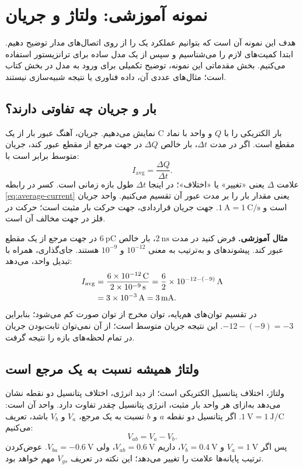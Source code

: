 \section{نمونه آموزشی: ولتاژ و جریان}
\label{sec:electrical-basics}
هدف این نمونه آن است که بتوانیم عملکرد یک  را از روی
اتصال‌های مدار توضیح دهیم. ابتدا کمیت‌های لازم را می‌شناسیم و سپس از یک مدل ساده
برای ترانزیستور استفاده می‌کنیم. بخش مقدماتی این نمونه، توضیح تکمیلی برای ورود
به مدل  در بخش  کتاب است؛ مثال‌های عددی آن، داده فناوری یا نتیجه شبیه‌سازی نیستند.

\subsection{بار و جریان چه تفاوتی دارند؟}
بار الکتریکی را با \(Q\) و واحد  با نماد \(\mathrm{C}\) نمایش می‌دهیم.
جریان، آهنگ عبور بار از یک مقطع است. اگر در مدت \(\Delta t\)، بار خالص
\(\Delta Q\) در جهت مرجع از مقطع عبور کند، جریان متوسط برابر است با:
\begin{equation}\label{eq:average-current}
I_{\mathrm{avg}}=\frac{\Delta Q}{\Delta t}.
\end{equation}
علامت \(\Delta\) یعنی «تغییر» یا «اختلاف»؛ در اینجا \(\Delta t\) طول بازه زمانی است.
کسر در رابطه \eqref{eq:average-current} یعنی مقدار بار را بر مدت عبور آن تقسیم می‌کنیم.
واحد جریان  است و \(\qty{1}{\ampere}=\qty{1}{\coulomb\per\second}\).
جهت جریان قراردادی، جهت حرکت بار مثبت است؛ حرکت  در فلز در جهت مخالف آن است.

\textbf{مثال آموزشی.} فرض کنید در مدت \(\qty{2}{\nano\second}\)، بار خالص
\(\qty{6}{\pico\coulomb}\) در جهت مرجع از یک مقطع عبور کند.
پیشوندهای  و  به‌ترتیب به معنی \(10^{-12}\) و \(10^{-9}\) هستند.
جای‌گذاری، همراه با تبدیل واحد، می‌دهد:
\begin{align}
I_{\mathrm{avg}}
&=\frac{6\times10^{-12}\,\mathrm{C}}{2\times10^{-9}\,\mathrm{s}}
=\frac{6}{2}\times10^{-12-(-9)}\,\mathrm{A}\notag\\
&=3\times10^{-3}\,\mathrm{A}=\qty{3}{\milli\ampere}.
\end{align}
در تقسیم توان‌های هم‌پایه، توان مخرج از توان صورت کم می‌شود؛ بنابراین
\(-12-(-9)=-3\). این نتیجه جریان متوسط است؛ از آن نمی‌توان ثابت‌بودن جریان
در تمام لحظه‌های بازه را نتیجه گرفت.

\subsection{ولتاژ همیشه نسبت به یک مرجع است}
ولتاژ، اختلاف پتانسیل الکتریکی است؛ از دید انرژی، اختلاف پتانسیل دو نقطه نشان می‌دهد
به‌ازای هر واحد بار مثبت، انرژی پتانسیل چقدر تفاوت دارد.
واحد آن  است: \(\qty{1}{\volt}=\qty{1}{\joule\per\coulomb}\).
اگر پتانسیل دو نقطه \(a\) و \(b\) نسبت به یک مرجع، \(V_a\) و \(V_b\) باشد، تعریف می‌کنیم:
\begin{equation}\label{eq:voltage-difference}
V_{ab}=V_a-V_b.
\end{equation}
پس اگر \(V_a=\qty{1}{\volt}\) و \(V_b=\qty{0.4}{\volt}\)،
داریم \(V_{ab}=\qty{0.6}{\volt}\)، ولی \(V_{ba}=\qty{-0.6}{\volt}\).
عوض‌کردن ترتیب پایانه‌ها علامت را تغییر می‌دهد؛ این نکته در تعریف \(V_{gs}\) مهم خواهد بود.

